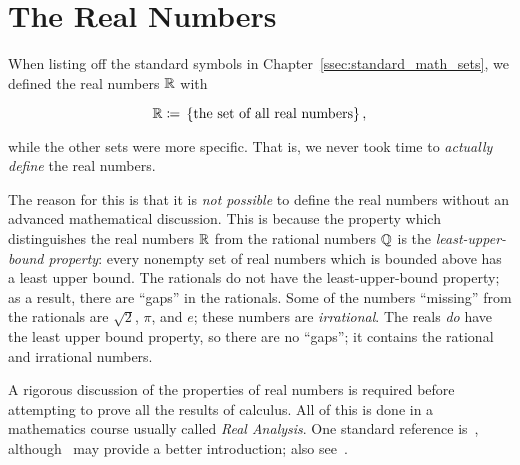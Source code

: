 \section{The Real Numbers}

When listing off the standard symbols in Chapter~\ref{ssec:standard_math_sets},
we defined the real numbers $\mathbb{R}$ with

\begin{equation}
    \mathbb{R} \coloneqq{} \left\{ \text{the set of all real numbers} \right\},
\end{equation}

\noindent
while the other sets were more specific.
That is, we never took time to \emph{actually define} the real numbers.

The reason for this is that it is \emph{not possible} to define
the real numbers without an advanced mathematical discussion.
This is because the property which distinguishes the real numbers $\mathbb{R}$ from
the rational numbers $\mathbb{Q}$ is the \emph{least-upper-bound property}:
every nonempty set of real numbers which is bounded above has a
least upper bound.
The rationals do not have the least-upper-bound property;
as a result, there are ``gaps'' in the rationals.
Some of the numbers ``missing'' from the rationals are $\sqrt{2}$, $\pi$,
and $e$; these numbers are \emph{irrational}.
The reals \emph{do} have the least upper bound property,
so there are no ``gaps'';
it contains the rational and irrational numbers.

A rigorous discussion of the properties of real numbers is required
before attempting to prove all the results of calculus.
All of this is done in a mathematics course usually called
\emph{Real Analysis}.
One standard reference is~\cite{BabyRudin},
although~\cite{LeblBasicAnalysisI} may provide a better introduction;
also see~\cite{AIMTextbooks}.
